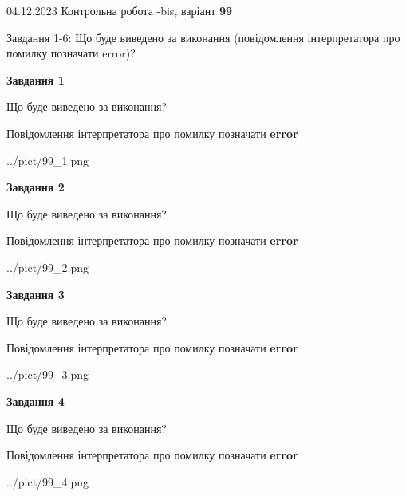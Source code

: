 \documentclass[12pt, ukrainian]{article}
\begin{document}
{{04.12.2023 Контрольна робота -bis, варіант  \No \textbf { 99 }\par}}
{

Завдання 1-6: Що буде виведено за виконання (повідомлення інтерпретатора про помилку позначати error)?


{\begin {center}\textbf{Завдання 1}\end {center}}\par
Що буде виведено за виконання? \par
Повідомлення інтерпретатора про помилку позначати \textbf{error}

\begin{center}
	{../pict/99_1.png}
\end{center}
\newpage

{\begin {center}\textbf{Завдання 2}\end {center}}\par
Що буде виведено за виконання? \par
Повідомлення інтерпретатора про помилку позначати \textbf{error}

\begin{center}
	{../pict/99_2.png}
\end{center}
\newpage

{\begin {center}\textbf{Завдання 3}\end {center}}\par
Що буде виведено за виконання? \par
Повідомлення інтерпретатора про помилку позначати \textbf{error}

\begin{center}
	{../pict/99_3.png}
\end{center}
\newpage

{\begin {center}\textbf{Завдання 4}\end {center}}\par
Що буде виведено за виконання? \par
Повідомлення інтерпретатора про помилку позначати \textbf{error}

\begin{center}
	{../pict/99_4.png}
\end{center}
\newpage

}
\end{document}
